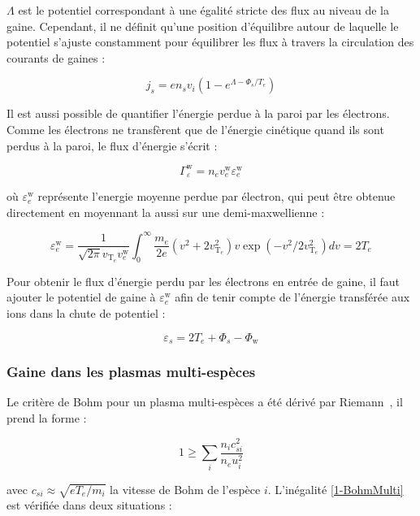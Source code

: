 \begin{refsection}
$\Lambda$ est le potentiel correspondant à une égalité stricte des flux au
niveau de la gaine. Cependant, il ne définit qu'une position
d'équilibre autour de laquelle le potentiel s'ajuste constamment pour
équilibrer les flux à travers la circulation des courants de gaines :

\begin{equation}
	j_{s}=en_{s}v_{i}\left(1-e^{\Lambda-\Phi_{s}/T_{e}}\right)
\end{equation}

Il est aussi possible de quantifier l'énergie perdue à la paroi par les
électrons. Comme les électrons ne transfèrent que de l'énergie cinétique quand
ils sont perdus à la paroi, le flux d'énergie s'écrit :

\begin{equation}
	\Gamma_\varepsilon^\text{w}=n_ev_{e}^\text{w}\varepsilon_e^\text{w}
\end{equation}

où $\varepsilon_e^\text{w}$ représente l'energie moyenne perdue par électron,
qui peut être obtenue directement en moyennant la aussi sur une
demi-maxwellienne :

\begin{equation}
	\varepsilon_e^\text{w}=\frac{1}{\sqrt{2\pi}v_{\text{T}_e}v_{e}^\text{w}}\int_0^\infty
	\frac{m_e}{2e}\left(v^2+2v_{\text{T}_e}^2\right)v\exp\left(-v^2/2v_{\text{T}_e}^2\right)dv
	=2T_e
\end{equation}

Pour obtenir le flux d'énergie perdu par les électrons en entrée de gaine, il
faut ajouter le potentiel de gaine à $\varepsilon_e^\text{w}$ afin de tenir
compte de l'énergie transférée aux ions dans la chute de potentiel :

\begin{equation}
	\varepsilon_s=2T_e+\Phi_s-\Phi_\text{w}
\end{equation}

\subsubsection{Gaine dans les plasmas multi-espèces}
Le critère de Bohm pour un plasma multi-espèces a été dérivé par
Riemann~\parencite{Riemann95}, il prend la forme :

\begin{equation}
\label{1-BohmMulti}
1\geq\sum_i{\frac{n_ic_{si}^2}{n_eu_i^2}}
\end{equation}

avec $c_{si}\approx\sqrt{eT_e/m_i}$ la vitesse de Bohm de l'espèce $i$.
L'inégalité \eqref{1-BohmMulti} est vérifiée dans deux situations :


\end{refsection}
